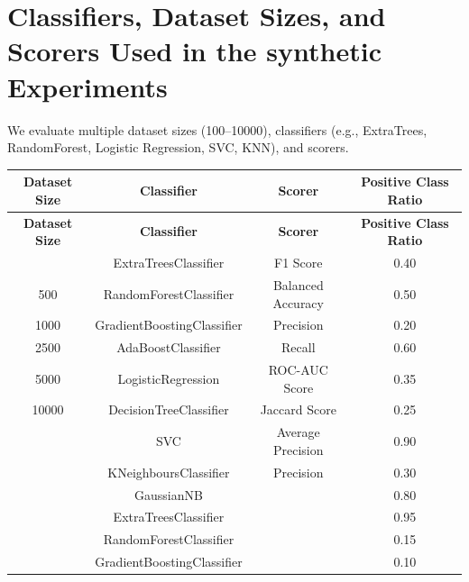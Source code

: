 \section{Classifiers, Dataset Sizes, and Scorers Used in the synthetic Experiments}
\label{appendix:Experiments}

We evaluate multiple dataset sizes (100--10000), classifiers (e.g., ExtraTrees, RandomForest, Logistic Regression, SVC, KNN), and scorers.

\begin{longtable}{|c|c|c|c|}
\hline
\textbf{Dataset Size} & \textbf{Classifier} & \textbf{Scorer} & \textbf{Positive Class Ratio} \\
\hline
\endfirsthead
\hline
\textbf{Dataset Size} & \textbf{Classifier} & \textbf{Scorer} & \textbf{Positive Class Ratio} \\
\hline
\endhead
\hline
\endfoot
100  & ExtraTreesClassifier           & F1 Score            & 0.40 \\
500  & RandomForestClassifier         & Balanced Accuracy   & 0.50 \\
1000 & GradientBoostingClassifier     & Precision           & 0.20 \\
2500  & AdaBoostClassifier             & Recall              & 0.60 \\
5000  & LogisticRegression             & ROC-AUC Score       & 0.35 \\
10000 & DecisionTreeClassifier         & Jaccard Score       & 0.25 \\
 & SVC                            &    Average Precision    & 0.90 \\
 & KNeighboursClassifier           &  Precision           & 0.30 \\
 & GaussianNB                     &    & 0.80 \\
 & ExtraTreesClassifier           &         & 0.95 \\
 & RandomForestClassifier         &         & 0.15 \\
 & GradientBoostingClassifier     &           & 0.10 \\
\hline
\end{longtable}

